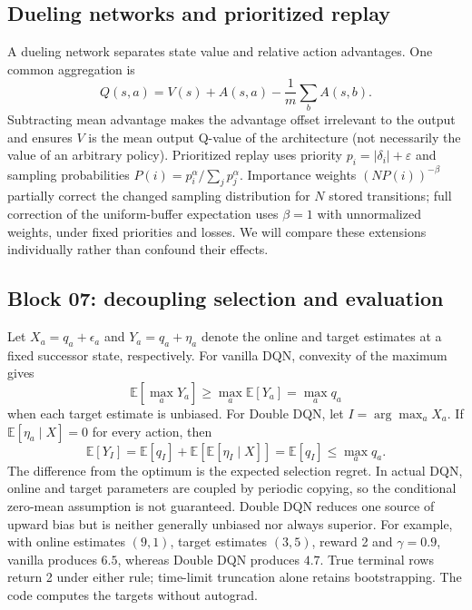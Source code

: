 \documentclass[11pt,a4paper]{article}
\newcommand{\E}{\mathbb E}
\begin{document}
\subsection{Dueling networks and prioritized replay}
A dueling network \cite{dueling} separates state value and relative action advantages. One common aggregation is
\[
 Q(s,a)=V(s)+A(s,a)-\frac1m\sum_b A(s,b).
\]
Subtracting mean advantage makes the advantage offset irrelevant to the output and ensures $V$ is the mean output Q-value of the architecture (not necessarily the value of an arbitrary policy). Prioritized replay \cite{per} uses priority $p_i=|\delta_i|+\varepsilon$ and sampling probabilities $P(i)=p_i^\alpha/\sum_jp_j^\alpha$. Importance weights $(NP(i))^{-\beta}$ partially correct the changed sampling distribution for $N$ stored transitions; full correction of the uniform-buffer expectation uses $\beta=1$ with unnormalized weights, under fixed priorities and losses. We will compare these extensions individually rather than confound their effects.


\subsection{Block 07: decoupling selection and evaluation}
Let $X_a=q_a+\epsilon_a$ and $Y_a=q_a+\eta_a$ denote the online and target
estimates at a fixed successor state, respectively. For vanilla DQN,
convexity of the maximum gives
\[
 \E[\max_a Y_a]\geq\max_a\E[Y_a]=\max_a q_a
\]
when each target estimate is unbiased. For Double DQN, let $I=\arg\max_a X_a$.
If $\E[\eta_a\mid X]=0$ for every action, then
\[
 \E[Y_I]=\E[q_I]+\E[\E[\eta_I\mid X]]=\E[q_I]\leq\max_a q_a.
\]
The difference from the optimum is the expected selection regret. In actual
DQN, online and target parameters are coupled by periodic copying, so the
conditional zero-mean assumption is not guaranteed. Double DQN reduces one
source of upward bias but is neither generally unbiased nor always superior.
For example, with online estimates $(9,1)$, target estimates $(3,5)$, reward
2 and $\gamma=0.9$, vanilla produces $6.5$, whereas Double DQN produces $4.7$.
True terminal rows return 2 under either rule; time-limit truncation alone
retains bootstrapping. The code computes the targets without autograd.
\end{document}
